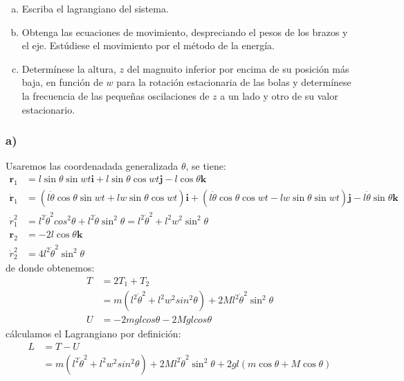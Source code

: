 \documentclass{article}
\begin{document}
\begin{enumerate}[a)]
    \item Escriba el lagrangiano del sistema.
    \item Obtenga las ecuaciones de movimiento, despreciando el pesos de los brazos y el eje. Estúdiese el movimiento por el método de la energía.
    \item Determínese la altura, $z$ del magnuito inferior por encima de su posición más baja, en función de $w$ para la rotación estacionaria de las bolas 
    y determínese la frecuencia de las pequeñas oscilaciones de $z$ a un lado y otro de su valor estacionario.
\end{enumerate}
\begin{tcolorbox}[breakable]
    \subsubsection*{a)}
    Usaremos las coordenadada generalizada $\theta$, se tiene:
    \begin{align*}
        \bm{r}_1 &= l \sin\theta \sin wt\bm{i} + l\sin\theta \cos wt \bm{j} - l\cos\theta \bm{k}\\
        \bm{\dot{r}}_1 
        &=(l\dot{\theta} \cos\theta \sin wt + lw \sin\theta \cos wt) \bm{i} 
        + (l\dot{\theta} \cos\theta \cos wt - lw\sin\theta \sin wt)\bm{j}
        - l\dot{\theta} \sin\theta \bm{k} \\
        \dot{r}_1^2 
        &=l^2\dot{\theta}^2cos^2\theta + l^2\dot{\theta}\sin^2\theta 
        = l^2\dot{\theta}^2 + l^2w^2\sin^2\theta \\ 
        \bm{r}_2 &= -2l \cos \theta \bm{k} \\
        \dot{r}_2^2 &= 4l^2\dot{\theta}^2\sin^2\theta
    \end{align*}
    de donde obtenemos:
    \begin{align*}
        T 
        &= 2T_1 + T_2 \\
        &= m(l^2\dot{\theta}^2+l^2w^2sin^2\theta) + 2Ml^2\dot{\theta}^2 \sin^2\theta \\
        U
        &= -2mglcos\theta - 2Mglcos\theta
    \end{align*}
    cálculamos el Lagrangiano por definición:
    \begin{align*}
        L 
        &= T-U \\
        &= m(l^2\dot{\theta}^2+l^2w^2sin^2\theta) + 2Ml^2\dot{\theta}^2 \sin^2\theta + 2gl(m\cos\theta + M\cos\theta)
    \end{align*}

\end{tcolorbox}
\end{document}
